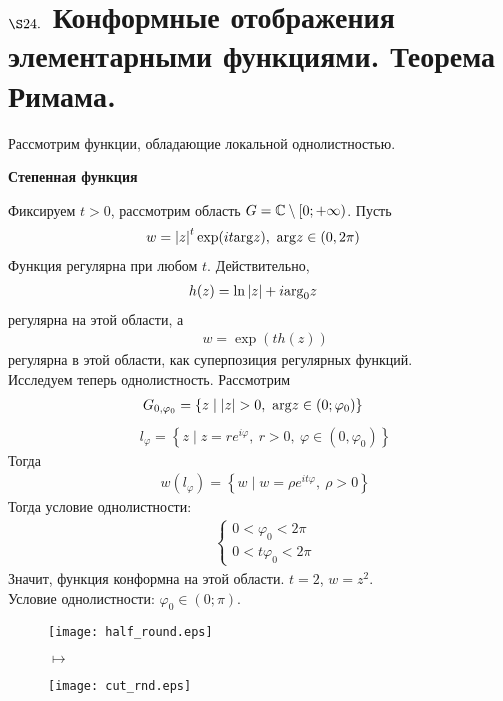 \section{$\S 24.$ Конформные отображения элементарными функциями. Теорема Римама.}
Рассмотрим функции, обладающие локальной однолистностью.
\begin{center}
    \textbf{Степенная функция}
\end{center}
Фиксируем $t > 0$, рассмотрим область $G = \mathbb{C} \setminus [0;+\infty)$. Пусть
\begin{align*}
  & w = \left| z \right|^t \exp(it \mathrm{arg} z), \ \mathrm{arg} z \in (0, 2 \pi)
\end{align*}
Функция регулярна при любом $t$. Действительно,
\begin{align*}
  & h(z) = \ln \left| z \right| + i \mathrm{arg}_0 z
\end{align*}
регулярна на этой области, а
\begin{align*}
  & w = \exp(t h(z))
\end{align*}
регулярна в этой области, как суперпозиция регулярных функций.
\\
Исследуем теперь однолистность. Рассмотрим
\begin{align*}
  & G_{0,\varphi_0} = \left\{ z \mid \left| z \right| > 0, \ \argt z \in (0; \varphi_0)\right\}
\end{align*}
\begin{align*}
  & l_{\varphi} = \left\{ z \mid z = r e^{i \varphi}, \ r > 0, \ \varphi \in (0, \varphi_0)\right\}
\end{align*}
Тогда
\begin{align*}
  & w(l_\varphi) = \left\{ w \mid w = \rho e^{i t \varphi}, \ \rho > 0 \right\}
\end{align*}
Тогда условие однолистности:
\begin{align*}
  & \begin{cases}
      0 < \varphi_0 < 2 \pi \\
      0 < t \varphi_0 < 2 \pi
  \end{cases}
\end{align*}
Значит, функция конформна на этой области.
\Example
$t = 2$, $w = z^2$.
\\
Условие однолистности: $\varphi_0 \in (0; \pi)$.
\\
\begin{figure}[h!]
    \begin{minipage}[c]{0.45\textwidth}
        \centering
        \texttt{[image: half\_round.eps]}
    \end{minipage}
    \begin{minipage}[c]{0.1\textwidth}
        \centering
        \LARGE{$\mapsto$}
    \end{minipage}
    \begin{minipage}[c]{0.45\textwidth}
        \centering
        \texttt{[image: cut\_rnd.eps]}
    \end{minipage}
    \label{fig:24.1}
\end{figure}

